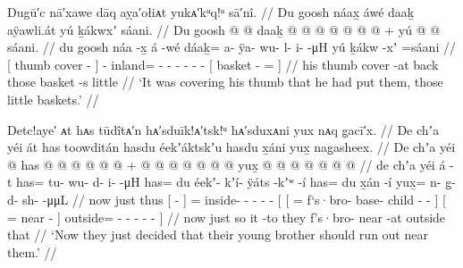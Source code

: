\ex\label{ex:92-170-cover-thumb-baskets}%
%
\begingl
	\glpreamble	Dugū′c nā′xawe dāq aỵa′ołiᴀt yukᴀ′kᵘq!ᵘ sā′nî. //
	\glpreamble	Du goosh náax̱ áwé daaḵ aÿawli.át yú ḵákwxʼ sáani. //
	\gla	{} Du goosh  @ {} {}  @ {}
		daaḵ @  @ {} @ {} @ {} @ {} @ {} @ {} +
		{} yú  @ {} @ \•sáani. {} //
	\glb	{} du goosh náa -x̱ {} á -wé
		dáaḵ= a- ÿa- wu- l- i-  -μH
		{} yú ḵákw -xʼ =sáani {} //
	\glc	{}[  thumb cover - {}]  -
		inland= - - - - -
			 -
		{}[  basket - = {}] //
	\gld	{} his thumb cover -at {}  {}
		back  {} {} {} {} {} {}
		{} those basket -s \•little {} //
	\glft	‘It was covering his thumb that he had put them, those little baskets.’
		//
\endgl
\xe

\ex\label{ex:92-171-thought-brother-should-run-out}%
%
\begingl
	\glpreamble	Detc!aye′ ᴀt hᴀs tūdîtᴀ′n hᴀ′sduīk!ᴀ′tsk!ᵘ hᴀ′sduxᴀni yux nᴀq g̣acī′x. //
	\glpreamble	De chʼa yéi át has toowditán hasdu éekʼáktskʼu hasdu x̱áni yux̱ nag̱asheex. //
	\gla	De chʼa yéi {}  @ {} {}
		has @  @ {} @ {} @ {} @ {} @ {} +
		{} {}  @ {}  @ {} @ {} @ {} @ {} {}
			{}  @ {}  @ {} {}
			yux̱ @  @ {} @ {} @ {} @ {} @ {} @ {} {} //
	\glb	de chʼa yéi {} á -t {}
		has= tu- wu- d- i-  -μH
		{} {} has= du éekʼ- kʼí- ÿáts -kʼʷ -í {}
			{} has= du x̱án -í {}
			yux̱= n- g̱- d- sh-  -μμL {} {} //
	\glc	now just thus {}[  - {}]
		= inside- - - -  -
		{}[ {}[ =  
			f‘s·bro- base- child - - {}]
			{}[ =  near - {}]
			outside= - - - -
			 - \· {}] //
	\gld	now just so {} it -to {}
		they  {} {} {} {} {}
		{} {}  {} f’s·bro-  {} {} {} {}
			{}  {} near -at {}
			outside  {} {} {} {} {} \·that {} //
	\glft	‘Now they just decided that their young brother should run out near them.’
		//
\endgl
\xe


